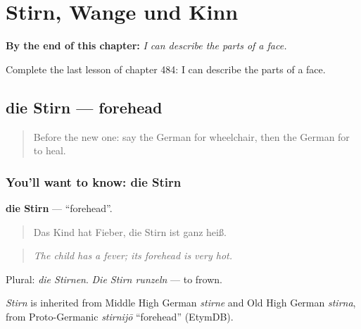 
\chapter{Stirn, Wange und Kinn}
\label{ch:ge-stirn-wange-und-kinn}

\begin{chapteropening}
\textbf{By the end of this chapter:} \emph{I can describe the parts of a face.}

Complete the last lesson of chapter 484: I can describe the parts of a face.
\end{chapteropening}

\section[die Stirn]{die Stirn — forehead}

\label{lesson:GE-C484-stirn}



\begin{quote}
Before the new one: say the German for wheelchair, then the German for to heal.
\end{quote}

\subsection*{You'll want to know: die Stirn}
\textbf{die Stirn} — \textquotedblleft{}forehead\textquotedblright{}.

\begin{quote}
Das Kind hat Fieber, die Stirn ist ganz heiß.
\end{quote}

\begin{quote}
\emph{The child has a fever; its forehead is very hot.}
\end{quote}

Plural: \emph{die Stirnen}. \emph{Die Stirn runzeln} — to frown.

\begin{cousinweb}
\emph{Stirn} is inherited from Middle High German \emph{stirne} and Old High German \emph{stirna}, from Proto-Germanic \emph{stirnijō} \textquotedblleft{}forehead\textquotedblright{} (EtymDB).
\end{cousinweb}

